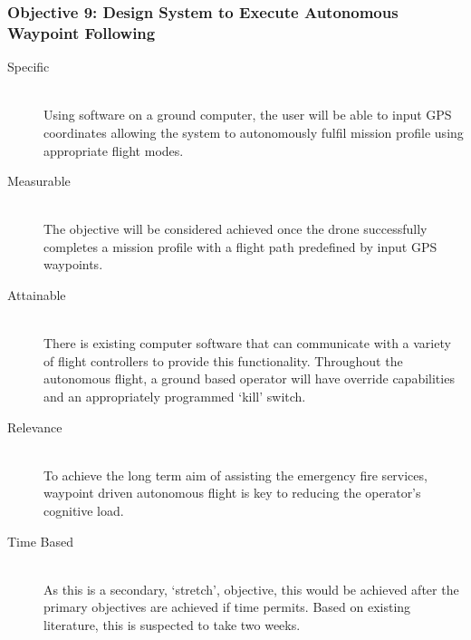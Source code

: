 \begin{appendices}
\subsubsection{Objective 9: Design System to Execute Autonomous Waypoint Following}
\begin{description}
    \item[Specific] \hfill \\
    Using software on a ground computer, the user will be able to input GPS coordinates allowing the system to autonomously fulfil mission profile using appropriate flight modes.
    \item[Measurable] \hfill \\ 
    The objective will be considered achieved once the drone successfully completes a mission profile with a flight path predefined by input GPS waypoints.
    \item[Attainable] \hfill \\
    There is existing computer software that can communicate with a variety of flight controllers to provide this functionality. Throughout the autonomous flight, a ground based operator will have override capabilities and an appropriately programmed `kill' switch.
    \item[Relevance] \hfill \\
    To achieve the long term aim of assisting the emergency fire services, waypoint driven autonomous flight is key to reducing the operator's cognitive load.
    \item[Time Based] \hfill \\
    As this is a secondary, `stretch', objective, this would be achieved after the primary objectives are achieved if time permits. Based on existing literature, this is suspected to take two weeks.
\end{description}


\end{appendices}
